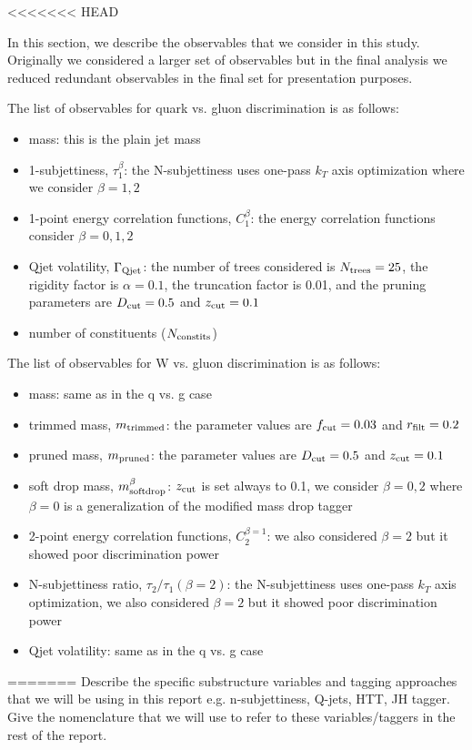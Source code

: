 <<<<<<< HEAD

\noindent
In this section, we describe the observables that we consider in this study.  
Originally we considered a larger set of observables but in the final analysis we reduced redundant observables in the final set for presentation purposes.

\noindent
The list of observables for quark vs. gluon discrimination is as follows: 
\begin{itemize}
\item mass: this is the plain jet mass
\item 1-subjettiness, $\tau_1^{\beta}$: the N-subjettiness uses one-pass $k_T$ axis optimization where we consider $\beta = 1,2$
\item 1-point energy correlation functions, $C_1^\beta$: the energy correlation functions consider $\beta=0,1,2$
\item Qjet volatility, $\Gamma_{\rm Qjet}$: the number of trees considered is $N_{\rm trees} = 25$, the rigidity factor is $\alpha = 0.1$, the truncation factor is 0.01, and the pruning parameters are $D_{\rm cut} = 0.5$ and $z_{\rm cut} = 0.1$
\item number of constituents ($N_{\rm constits}$)
\end{itemize}

\noindent
The list of observables for W vs. gluon discrimination is as follows: 
\begin{itemize}
\item mass: same as in the q vs. g case
\item trimmed mass, $m_{\rm trimmed}$: the parameter values are $f_{\rm cut} = 0.03$ and $r_{\rm filt} = 0.2$
\item pruned mass, $m_{\rm pruned}$: the parameter values are $D_{\rm cut} = 0.5$ and $z_{\rm cut} = 0.1$
\item soft drop mass, $m_{\rm soft drop}^{\beta}$: $z_{\rm cut}$ is set always to 0.1, we consider $\beta=0,2$ where $\beta=0$ is a generalization of the modified mass drop tagger
\item 2-point energy correlation functions, $C_2^{\beta=1}$: we also considered $\beta=2$ but it showed poor discrimination power
\item N-subjettiness ratio, $\tau_2 / \tau_1 (\beta = 2)$: the N-subjettiness uses one-pass $k_T$ axis optimization, we also considered $\beta=2$ but it showed poor discrimination power
\item Qjet volatility: same as in the q vs. g case
\end{itemize}
=======
Describe the specific substructure variables and tagging approaches
that we will be using in this report e.g. n-subjettiness, Q-jets, HTT,
JH tagger. Give the nomenclature that we will use to refer to these
variables/taggers in the rest of the report.\\

